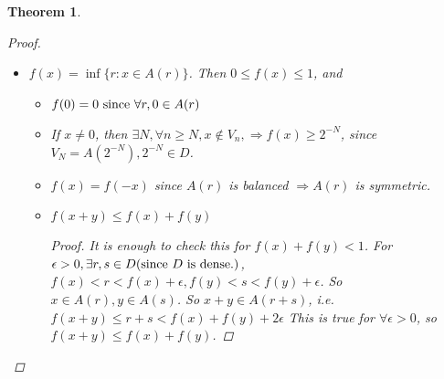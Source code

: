 \documentclass{article}
\newtheorem*{property}{Property}
\newtheorem*{remark}{Remark}
\newtheorem*{theorem}{Theorem}
\begin{document}
\begin{theorem}
\begin{proof}
\begin{itemize}
\begin{property}
          \begin{proof} 
            \[r = \sum_{1}^{M}{C_n(r)2^{-n}}, s = \sum_{1}^{N}{C_n(s)2^{-n}}\]
            we choose $K = \max{\{M, N\}}$.
            \[r = \sum_{1}^{K}{C_n(r)2^{-n}}, s = \sum_{1}^{K}{C_n(s)2^{-n}}, r+s = \sum_{1}^{K}{C_n(r+s)2^{-n}}\]
            $V_{n+1} + V_{n+1} + V_{n+1} + V_{n+1} \subset V_{n} \Rightarrow V_{n+1} + V_{n+1} \subset V_n$,
            so we have $\sum_{1}^{2^i}{V_{K - i}} \subset V_{K}$.
            $C_n(r) + C_n(s)$ can be $\{0, 1, 2\}$, if $C_n(r) + C_n(s) = 2$, $V_n + V_n \subset V_{n+1}$,
            we can have $A(s) + A(r) \subset A(s+t)$.
          \end{proof}
        \end{property}
        \begin{remark} \hfill
          \begin{itemize}
            \item Each $A(r)$ is balanced.
            $(A, B \textnormal{ are balanced} \Rightarrow A + B \textnormal{ is balanced.})$
            \item $\forall r < s, A(r) \subset A(s)$.$(A(r) + A(s - r) \subset A(s), 0 \in A(s-r))$
          \end{itemize}
        \end{remark}
        \item $f(x) = \inf{\{r:x\in A(r)\}}$. Then $0 \le f(x) \le 1$, and
        \begin{itemize}
          \item $f(0) = 0 \textnormal{ since } \forall r, 0 \in A(r)$
          \item If $x \ne 0$, then $\exists N, \forall n \ge N, x \not\in V_n, \Rightarrow f(x) \ge 2^{-N}$,
          since $V_N = A(2^{-N}), 2^{-N} \in D$.
          \item $f(x) = f(-x)$ since $A(r)$ is balanced $\Rightarrow A(r)$ is symmetric.
          \item $f(x+y) \le f(x) + f(y)$
            \begin{proof}
              It is enough to check this for $f(x) + f(y) < 1$.
              For $\epsilon > 0, \exists r, s \in D \textnormal{(since $D$ is dense.)}$,
              $f(x) < r < f(x) + \epsilon, f(y) < s < f(y) + \epsilon$.
              So $x \in A(r), y \in A(s)$.
              So $x + y \in A(r + s)$, i.e. $f(x+y) \le r + s < f(x) + f(y) + 2 \epsilon$
              This is true for $\forall \epsilon > 0$, so $f(x+y) \le f(x) + f(y)$.
            \end{proof}

\end{itemize}
\end{itemize}
\end{proof}
\end{theorem}
\end{document}

